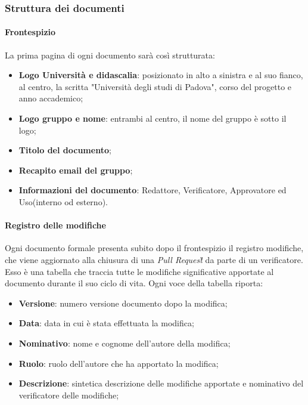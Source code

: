 	\subsubsection{Struttura dei documenti}
		\paragraph*{Frontespizio}
		\aCapo{}    
			La prima pagina di ogni documento sarà così strutturata:
				\begin{itemize}
					\item \textbf{Logo Università e didascalia}: posizionato in alto a sinistra e al suo fianco, al centro, la scritta "Università degli studi di Padova", corso del progetto e anno accademico;
					\item \textbf{Logo gruppo e nome}: entrambi al centro, il nome del gruppo è sotto il logo;
					\item \textbf{Titolo del documento};
					\item \textbf{Recapito email del gruppo};
					\item \textbf{Informazioni del documento}: Redattore, Verificatore, Approvatore ed Uso(interno od esterno).
				\end{itemize}
			
		\paragraph*{Registro delle modifiche}
		\aCapo{}  
			Ogni documento formale presenta subito dopo il frontespizio il registro modifiche, che viene aggiornato alla chiusura di una \textit{Pull Request\G{}} da parte di un verificatore.
			Esso è una tabella che traccia tutte le modifiche significative apportate al documento durante il suo ciclo di vita. Ogni voce della tabella riporta:
				\begin{itemize}
					\item \textbf{Versione}: numero versione documento dopo la modifica;
					\item \textbf{Data}: data in cui è stata effettuata la modifica;
					\item \textbf{Nominativo}: nome e cognome dell'autore della modifica;
					\item \textbf{Ruolo}: ruolo dell'autore che ha apportato la modifica;
					\item \textbf{Descrizione}: sintetica descrizione delle modifiche apportate e nominativo del verificatore delle modifiche;
				\end{itemize}
	
